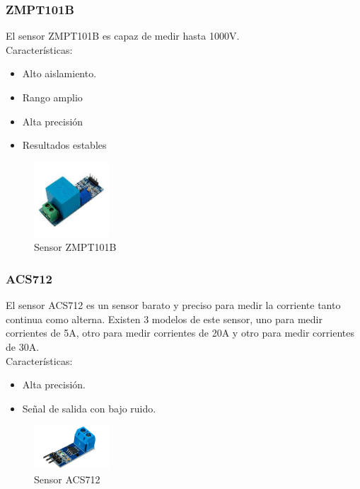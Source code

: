 \begin{titlepage}
\subsubsection{ZMPT101B}
El sensor ZMPT101B\cite{ref6} es capaz de medir hasta 1000V. \\

Características:
\begin{itemize}
	\item Alto aislamiento.
	\item Rango amplio
	\item Alta precisión
	\item Resultados estables
\end{itemize}

\begin{figure}[h!]
	\centering
	\includegraphics[width=0.25\textwidth]{imagenes/zmpt101b.jpeg}
	\caption{Sensor ZMPT101B\cite{zmpt101b_img}}
\end{figure}


\subsubsection{ACS712}
El sensor ACS712\cite{ref7} es un sensor barato y preciso para medir la corriente tanto continua como alterna. Existen 3 modelos de este sensor, uno para medir corrientes de 5A, otro para medir corrientes de 20A y otro para medir corrientes de 30A. \\

Características:
\begin{itemize}
	\item Alta precisión.
	\item Señal de salida con bajo ruido.
\end{itemize}
\begin{figure}[h!]
	\centering
	\includegraphics[width=0.25\textwidth]{imagenes/acs712.png}
	\caption{Sensor ACS712\cite{acs712_img}}
\end{figure}


\end{titlepage}
